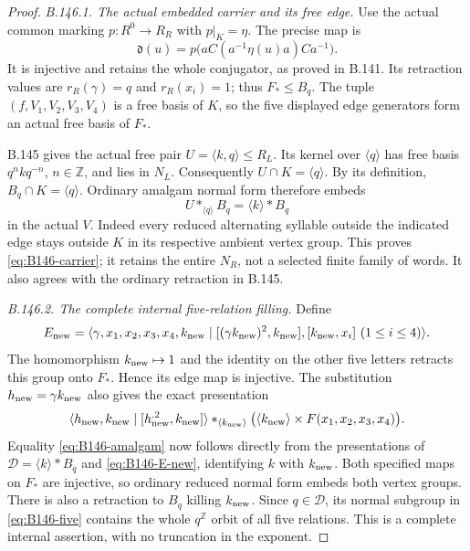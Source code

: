 \begin{proof}
\emph{B.146.1. The actual embedded carrier and its free edge.}
Use the actual common marking $p:R^0\to R_R$ with $p|_K=\eta$.
The precise map is
\begin{equation}\label{eq:B146-d-map}
 \mathfrak d(u)=p\bigl(aC(a^{-1}\eta(u)a)Ca^{-1}\bigr).
\end{equation}
It is injective and retains the whole conjugator, as proved in
B.141. Its retraction values are
$r_R(\gamma)=q$ and $r_R(x_i)=1$; thus $F_*\leq B_q$.
The tuple $(f,V_1,V_2,V_3,V_4)$ is a free basis of $K$, so the
five displayed edge generators form an actual free basis of $F_*$.

B.145 gives the actual free pair $U=\langle k,q\rangle\leq R_L$.
Its kernel over $\langle q\rangle$ has free basis
$q^nkq^{-n}$, $n\in\mathbb Z$, and lies in $N_L$.
Consequently $U\cap K=\langle q\rangle$. By its definition,
$B_q\cap K=\langle q\rangle$. Ordinary amalgam normal form
therefore embeds
\[
 U*_{\langle q\rangle}B_q
       =\langle k\rangle*B_q
\]
in the actual $V$. Indeed every reduced alternating syllable
outside the indicated edge stays outside $K$ in its respective
ambient vertex group. This proves \eqref{eq:B146-carrier}; it
retains the entire $N_R$, not a selected finite family of words.
It also agrees with the ordinary retraction in B.145.

\emph{B.146.2. The complete internal five-relation filling.}
Define
\begin{equation}\label{eq:B146-E-new}
 E_{\rm new}=\langle\gamma,x_1,x_2,x_3,x_4,k_{\rm new}
 \mid[(\gamma k_{\rm new})^2,k_{\rm new}],
       [k_{\rm new},x_i]\ (1\leq i\leq4)\rangle.
\end{equation}
The homomorphism $k_{\rm new}\mapsto1$ and the identity on the
other five letters retracts this group onto $F_*$. Hence its
edge map is injective. The substitution
$h_{\rm new}=\gamma k_{\rm new}$ also gives the exact presentation
\[
 \langle h_{\rm new},k_{\rm new}\mid
                     [h_{\rm new}^{,2},k_{\rm new}]\rangle
 *_{\langle k_{\rm new}\rangle}
 \bigl(\langle k_{\rm new}\rangle\times F(x_1,x_2,x_3,x_4)\bigr).
\]
Equality \eqref{eq:B146-amalgam} now follows directly from the
presentations of $\mathscr D=\langle k\rangle*B_q$ and
\eqref{eq:B146-E-new}, identifying $k$ with $k_{\rm new}$.
Both specified maps on $F_*$ are injective, so ordinary reduced
normal form embeds both vertex groups. There is also a retraction
to $B_q$ killing $k_{\rm new}$. Since $q\in\mathscr D$, its
normal subgroup in \eqref{eq:B146-five} contains the whole
$q^{\mathbb Z}$ orbit of all five relations. This is a complete
internal assertion, with no truncation in the exponent.


\end{proof}
